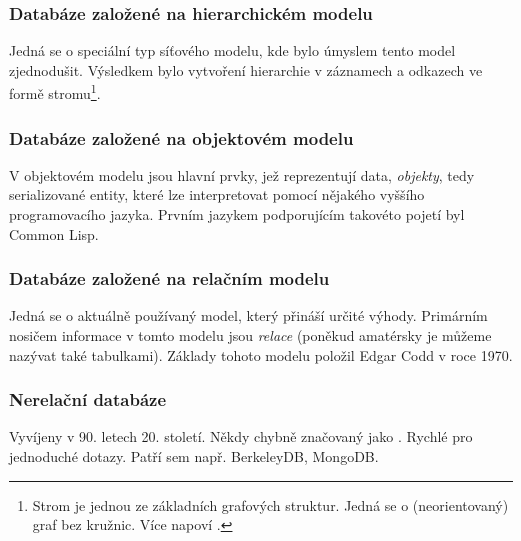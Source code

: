 \subsubsection{Databáze založené na hierarchickém modelu}
Jedná se o speciální typ síťového modelu, kde bylo úmyslem tento model zjednodušit. Výsledkem bylo vytvoření hierarchie v záznamech a odkazech ve formě stromu\footnote{Strom je jednou ze základních grafových struktur. Jedná se o (neorientovaný) graf bez kružnic. Více napoví \citep[str. 91 -- 96]{cormen:algorithms}.}.

\subsubsection{Databáze založené na objektovém modelu}
V objektovém modelu jsou hlavní prvky, jež reprezentují data, \textit{objekty}, tedy serializované entity, které lze interpretovat pomocí nějakého vyššího programovacího jazyka. Prvním jazykem podporujícím takovéto pojetí byl Common Lisp.

\subsubsection{Databáze založené na relačním modelu}
Jedná se o aktuálně používaný model, který přináší určité výhody. Primárním nosičem informace v tomto modelu jsou \textit{relace} (poněkud amatérsky je můžeme nazývat také tabulkami). Základy tohoto modelu položil Edgar Codd v roce 1970.\citep{codd:relationalModel}

\subsubsection{Nerelační databáze}
Vyvíjeny v 90. letech 20. století. Někdy chybně značovaný jako . Rychlé pro jednoduché dotazy. Patří sem např. BerkeleyDB, MongoDB.

